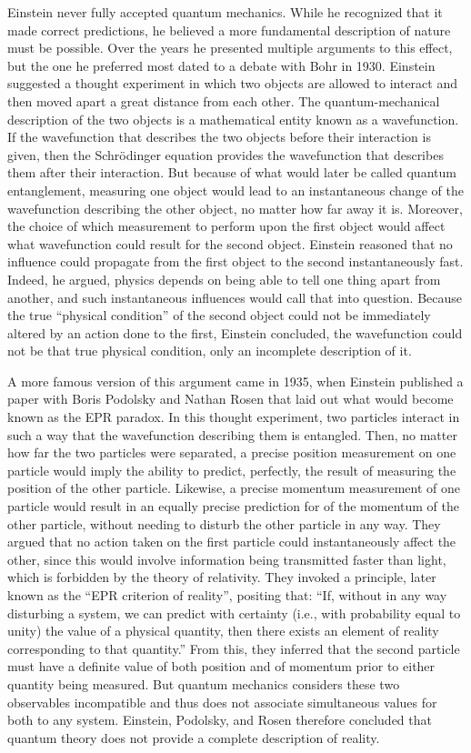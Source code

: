 \documentclass[twoside]{memoir}
\begin{document}
Einstein never fully accepted quantum mechanics. While he recognized that it made correct predictions, he believed a more fundamental description of nature must be possible. Over the years he presented multiple arguments to this effect, but the one he preferred most dated to a debate with Bohr in 1930. Einstein suggested a thought experiment in which two objects are allowed to interact and then moved apart a great distance from each other. The quantum-mechanical description of the two objects is a mathematical entity known as a wavefunction. If the wavefunction that describes the two objects before their interaction is given, then the Schrödinger equation  provides the wavefunction that describes them after their interaction. But because of what would later be called quantum entanglement, measuring one object would lead to an instantaneous change of the wavefunction describing the other object, no matter how far away it is. Moreover, the choice of which measurement to perform upon the first object would affect what wavefunction could result for the second object. Einstein reasoned that no influence could propagate from the first object to the second instantaneously fast. Indeed, he argued, physics depends on being able to tell one thing apart from another, and such instantaneous influences would call that into question. Because the true \enquote{physical condition} of the second object could not be immediately altered by an action done to the first, Einstein concluded, the wavefunction could not be that true physical condition, only an incomplete description of it.

A more famous version of this argument came in 1935, when Einstein published a paper with Boris Podolsky and Nathan Rosen that laid out what would become known as the \acrshort{EPR} paradox. In this thought experiment, two particles interact in such a way that the wavefunction describing them is entangled. Then, no matter how far the two particles were separated, a precise position measurement on one particle would imply the ability to predict, perfectly, the result of measuring the position of the other particle. Likewise, a precise momentum measurement of one particle would result in an equally precise prediction for of the momentum of the other particle, without needing to disturb the other particle in any way. They argued that no action taken on the first particle could instantaneously affect the other, since this would involve information being transmitted faster than light, which is forbidden by the theory of relativity. They invoked a principle, later known as the \enquote{\acrshort{EPR} criterion of reality}, positing that: \enquote{If, without in any way disturbing a system, we can predict with certainty (i.e., with probability equal to unity) the value of a physical quantity, then there exists an element of reality corresponding to that quantity.} From this, they inferred that the second particle must have a definite value of both position and of momentum prior to either quantity being measured. But quantum mechanics considers these two observables incompatible and thus does not associate simultaneous values for both to any system. Einstein, Podolsky, and Rosen therefore concluded that quantum theory does not provide a complete description of reality.
\end{document}
